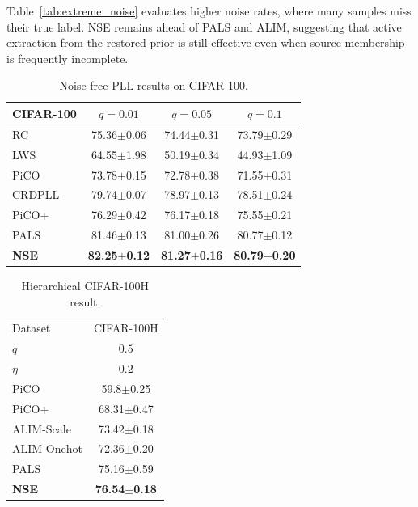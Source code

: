 Table~\ref{tab:extreme_noise} evaluates higher noise rates, where many samples
miss their true label. NSE remains ahead of PALS and ALIM, suggesting that
active extraction from the restored prior is still effective even when source
membership is frequently incomplete.

\begin{table}[t]
\centering
\fontsize{8pt}{8pt}\selectfont
\begin{tabular}{l|c|c|c}
\hline
CIFAR-100 & $q=0.01$ & $q=0.05$ & $q=0.1$ \\
\hline
RC & 75.36$\pm$0.06& 74.44$\pm$0.31& 73.79$\pm$0.29\\
LWS & 64.55$\pm$1.98& 50.19$\pm$0.34& 44.93$\pm$1.09\\
PiCO & 73.78$\pm$0.15& 72.78$\pm$0.38& 71.55$\pm$0.31\\
CRDPLL & 79.74$\pm$0.07& 78.97$\pm$0.13& 78.51$\pm$0.24\\
PiCO+ &76.29$\pm$0.42 & 76.17$\pm$0.18 & 75.55$\pm$0.21 \\
PALS &{ 81.46$\pm$0.13} & {81.00$\pm$0.26} & { 80.77$\pm$0.12} \\
\hline
\rowcolor{gray!15} \textbf{NSE} & \textbf{82.25$\pm$0.12} & \textbf{81.27$\pm$0.16} & \textbf{80.79$\pm$0.20} \\
\hline 
\end{tabular} 
\caption{Noise-free PLL results on CIFAR-100.}
\label{tab:no_noise}
\end{table}

\begin{table}[t]
\centering
\fontsize{8pt}{8pt}\selectfont
\begin{tabular}{l|c}
\hline
Dataset &CIFAR-100H\\
$q$ &$0.5$\\
$\eta$ &$0.2$ \\
\hline
PiCO & 59.8$\pm$0.25\\
PiCO+ & 68.31$\pm$0.47\\
ALIM-Scale & 73.42$\pm$0.18\\
ALIM-Onehot & 72.36$\pm$0.20\\
PALS & {75.16$\pm$0.59}\\
\rowcolor{gray!15} \textbf{NSE} & \textbf{76.54$\pm$0.18}\\
\hline
\end{tabular}
\caption{Hierarchical CIFAR-100H result.}
\label{tab:cifar100h}
\end{table}

